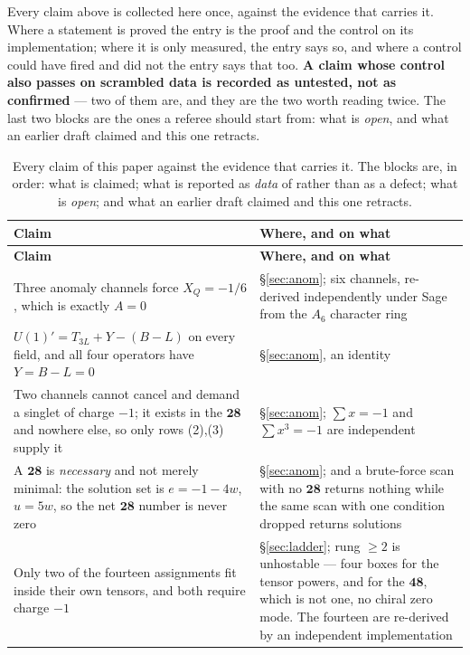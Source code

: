 \documentclass[11pt,a4paper]{article}
\newcommand{\rep}[1]{\mathbf{#1}}
\begin{document}
Every claim above is collected here once, against the evidence that carries it. Where a
statement is proved the entry is the proof and the control on its implementation; where it is
only measured, the entry says so, and where a control could have fired and did not the entry
says that too. \textbf{A claim whose control also passes on scrambled data is recorded as
untested, not as confirmed} --- two of them are, and they are the two worth reading twice.
The last two blocks are the ones a referee should start from: what is \emph{open}, and what an
earlier draft claimed and this one retracts.

\begingroup
\small
\begin{longtable}{p{}p{}}
\caption{Every claim of this paper against the evidence that carries it. The blocks are, in order:
what is claimed; what is reported as \emph{data} of \cite{KM25} rather than as a defect; what is
\emph{open}; and what an earlier draft claimed and this one retracts.}\\
\toprule
\rowcolor{hdrblue!12}
\textbf{Claim} & \textbf{Where, and on what}\\
\midrule
\endfirsthead
\toprule
\rowcolor{hdrblue!12}
\textbf{Claim} & \textbf{Where, and on what}\\
\midrule
\endhead
Three anomaly channels force $X_Q=-1/6$, which is exactly $A=0$ & \S\ref{sec:anom}; six channels,
re-derived independently under Sage from the $A_6$ character ring\\
$U(1)'=T_{3L}+Y-(B-L)$ on every field, and all four operators have $Y=B-L=0$ & \S\ref{sec:anom},
an identity\\
Two channels cannot cancel and demand a singlet of charge $-1$; it exists in the $\rep{28}$ and
nowhere else, so only rows (2),(3) supply it & \S\ref{sec:anom}; $\sum x=-1$ and $\sum x^3=-1$ are
independent\\
A $\rep{28}$ is \emph{necessary} and not merely minimal: the solution set is $e=-1-4w$, $u=5w$, so
the net $\rep{28}$ number is never zero & \S\ref{sec:anom}; and a brute-force scan with no $\rep{28}$
returns nothing while the same scan with one condition dropped returns solutions\\
Only two of the fourteen assignments fit inside their own tensors, and both require charge $-1$ &
\S\ref{sec:ladder}; rung $\ge2$ is unhostable --- four boxes for the tensor powers, and for the
$\rep{48}$, which is not one, no chiral zero mode. The fourteen are re-derived by an
independent implementation\\

\end{longtable}
\end{document}
